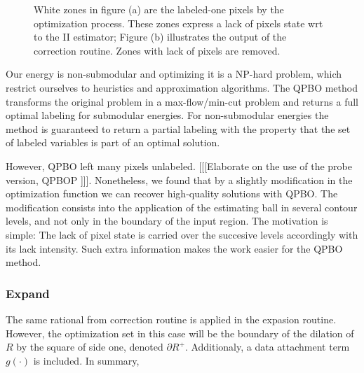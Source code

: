 \documentclass[runningheads]{llncs}
\begin{document}
	\begin{figure}[!ht]
		\center
		\hspace{80pt}
		\caption{White zones in figure (a) are the labeled-one pixels by the optimization process. These zones express a lack of pixels state wrt to the II estimator; Figure (b) illustrates the output of the correction routine. Zones with lack of pixels are removed.   }				
	\end{figure}
	
	
	Our energy is non-submodular and optimizing it is a NP-hard problem, which restrict ourselves to heuristics and approximation algorithms. The QPBO method \cite{kolmogorov07} transforms the original problem in a max-flow/min-cut problem and returns a full optimal labeling for submodular energies. For non-submodular energies the method is guaranteed to return a partial labeling with the property that the set of labeled variables is part of an optimal solution. 
	
	However, QPBO left many pixels unlabeled. [[[Elaborate on the use of the probe version, QPBOP \cite{rother07}]]]. Nonetheless, we found that by a slightly modification in the optimization function we can recover high-quality solutions with QPBO. The modification consists into the application of the estimating ball in several contour levels, and not only in the boundary of the input region. The motivation is simple: The lack of pixel state is carried over the succesive levels accordingly with its lack intensity. Such extra information makes the work easier for the QPBO method.
	
\subsubsection{Expand}
The same rational from correction routine is applied in the expasion routine. However, the optimization set in this case will be the boundary of the dilation of $R$ by the square of side one, denoted $\partial R^+$. Additionaly, a data attachment term $g(\cdot)$ is included. In summary,
\end{document}
